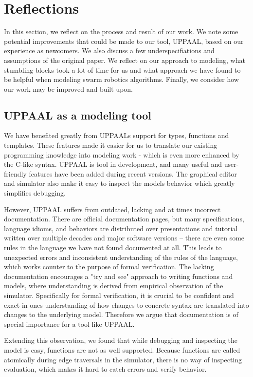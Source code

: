 \section{Reflections}

In this section, we reflect on the process and result of our work.
We note some potential improvements that could be made to our tool, UPPAAL, based on our experience as newcomers.
We also discuss a few underspecifiations and assumptions of the original paper.
We reflect on our approach to modeling, what stumbling blocks took a lot of time for us and what approach we have found to be helpful when modeling swarm robotics algorithms.
Finally, we consider how our work may be improved and built upon.

\subsection{UPPAAL as a modeling tool}

We have benefited greatly from UPPAALs support for types, functions and templates.
These features made it easier for us to translate our existing programming knowledge into modeling work - which is even more enhanced by the C-like syntax.
UPPAAL is tool in development, and many useful and user-friendly features have been added during recent versions.
The graphical editor and simulator also make it easy to inspect the models behavior which greatly simplifies debugging.

However, UPPAAL suffers from outdated, lacking and at times incorrect documentation.
There are official documentation pages, but many specifications, language idioms, and behaviors are distributed over presentations and tutorial written over multiple decades and major software versions – there are even some rules in the language we have not found documented at all.
This leads to unexpected errors and inconsistent understanding of the rules of the language, which works counter to the purpose of formal verification.
The lacking documentation encourages a "try and see" approach to writing functions and models, where understanding is derived from empirical observation of the simulator.
Specifically for formal verification, it is crucial to be confident and exact in ones understanding of how changes to concrete syntax are translated into changes to the underlying model.
Therefore we argue that documentation is of special importance for a tool like UPPAAL.

Extending this observation, we found that while debugging and inspecting the model is easy, functions are not as well supported.
Because functions are called atomically during edge traversals in the simulator, there is no way of inspecting evaluation, which makes it hard to catch errors and verify behavior.

